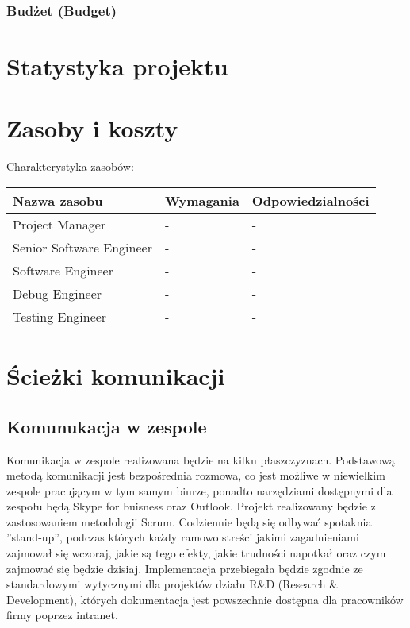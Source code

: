 \subsection{Budżet (Budget)}


\chapter{Statystyka projektu}
\chapter{Zasoby i koszty}
Charakterystyka zasobów:

\begin{center}
    \begin{tabular}{ | l | l | p{5cm} |}
    \hline
    Nazwa zasobu & Wymagania & Odpowiedzialności \\ \hline
    Project Manager & - & - \\ \hline
    Senior Software Engineer & - & - \\ \hline
    Software Engineer & - & - \\ \hline
    Debug Engineer & - & - \\ \hline
    Testing Engineer & - & - \\ \hline
    \hline
    \end{tabular}
\end{center}

\chapter{Ścieżki komunikacji}
\section{Komunukacja w zespole}
Komunikacja w zespole realizowana będzie na kilku płaszczyznach. Podstawową metodą komunikacji jest bezpośrednia rozmowa, co jest możliwe w niewielkim zespole pracującym w tym samym biurze, ponadto narzędziami dostępnymi dla zespołu będą Skype for buisness oraz Outlook. Projekt realizowany będzie z zastosowaniem metodologii Scrum. Codziennie będą się odbywać spotaknia ''stand-up'', podczas których każdy ramowo streści jakimi zagadnieniami zajmował się wczoraj, jakie są tego efekty, jakie trudności napotkał oraz czym zajmować się będzie dzisiaj. Implementacja przebiegała będzie zgodnie ze standardowymi wytycznymi dla projektów działu R&D (Research & Development), których dokumentacja jest powszechnie dostępna dla pracowników firmy poprzez intranet.
